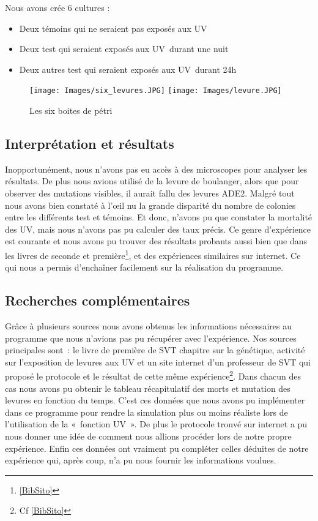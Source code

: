     Nous avons crée 6 cultures : 
    \begin{itemize}
      \item Deux témoins qui ne seraient pas exposés aux UV
      \item Deux test qui seraient exposés aux UV durant une nuit
      \item Deux autres test qui seraient exposés aux UV durant 24h
    \end{itemize}
    
    \begin{figure}[H]
			\begin{center}
				\texttt{[image: Images/six\_levures.JPG]}
				\texttt{[image: Images/levure.JPG]}
			\end{center}
			\caption{Les six boites de pétri}
		\end{figure}

\subsection{Interprétation et résultats}
  Inopportunément, nous n'avons pas eu accès à des microscopes pour analyser les résultats. De plus nous avions utilisé de la levure de boulanger, alors que pour observer des mutations visibles, il aurait fallu des levures ADE2. Malgré tout nous avons bien constaté à l'œil nu la grande disparité du nombre de colonies entre les différents test et témoins. Et donc, n'avons pu que constater la mortalité des UV, mais nous n'avons pas pu calculer des taux précis.
  Ce genre d'expérience est courante et nous avons pu trouver des résultats probants aussi bien que dans les livres de seconde et première\footnote{\ref{BibSito}}, et des expériences similaires sur internet. Ce qui nous a permis d'enchaîner facilement sur la réalisation du programme.

\subsection{Recherches complémentaires}
  Grâce à plusieurs sources nous avons obtenus les informations nécessaires au programme que nous n’avions pas pu récupérer avec l’expérience. Nos sources principales sont : le livre de première de SVT chapitre sur la génétique, activité sur l’exposition de levures aux UV et un site internet d’un professeur de SVT qui proposé le protocole et le résultat de cette même expérience\footnote{Cf \ref{BibSito}}. Dans chacun des cas nous avons pu obtenir le tableau récapitulatif des morts et mutation des levures en fonction du temps. C’est ces données que nous avons pu implémenter dans ce programme pour rendre la simulation plus ou moins réaliste lors de l’utilisation de la « fonction UV ». De plus le protocole trouvé sur internet a pu nous donner une idée de comment nous allions procéder lors de notre propre expérience. Enfin ces données ont vraiment pu compléter celles déduites de notre expérience qui, après coup, n’a pu nous fournir les informations voulues.
  
